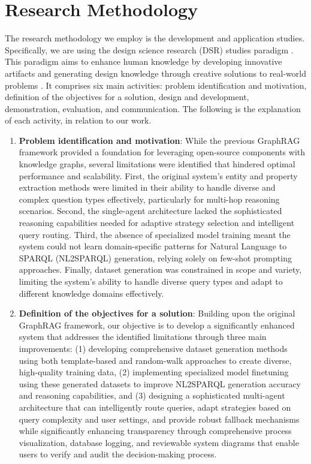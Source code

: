 \section{Research Methodology}
The research methodology we employ is the development and application studies. Specifically, we are using the design science research (DSR) studies paradigm \citep{vomBrocke2020}. This paradigm aims to enhance human knowledge by developing innovative artifacts and generating design knowledge through creative solutions to real-world problems \citep{hevner2004design}. It comprises six main activities: problem identification and motivation, definition of the objectives for a solution, design and development, demonstration, evaluation, and communication. The following is the explanation of each activity, in relation to our work.
\begin{enumerate}
    \item \textbf{Problem identification and motivation}: While the previous GraphRAG framework provided a foundation for leveraging open-source components with knowledge graphs, several limitations were identified that hindered optimal performance and scalability. First, the original system's entity and property extraction methods were limited in their ability to handle diverse and complex question types effectively, particularly for multi-hop reasoning scenarios. Second, the single-agent architecture lacked the sophisticated reasoning capabilities needed for adaptive strategy selection and intelligent query routing. Third, the absence of specialized model training meant the system could not learn domain-specific patterns for Natural Language to SPARQL (NL2SPARQL) generation, relying solely on few-shot prompting approaches. Finally, dataset generation was constrained in scope and variety, limiting the system's ability to handle diverse query types and adapt to different knowledge domains effectively.
    \item \textbf{Definition of the objectives for a solution}: Building upon the original GraphRAG framework, our objective is to develop a significantly enhanced system that addresses the identified limitations through three main improvements: (1) developing comprehensive dataset generation methods using both template-based and random-walk approaches to create diverse, high-quality training data, (2) implementing specialized model finetuning using these generated datasets to improve NL2SPARQL generation accuracy and reasoning capabilities, and (3) designing a sophisticated multi-agent architecture that can intelligently route queries, adapt strategies based on query complexity and user settings, and provide robust fallback mechanisms while significantly enhancing transparency through comprehensive process visualization, database logging, and reviewable system diagrams that enable users to verify and audit the decision-making process.

\end{enumerate}
